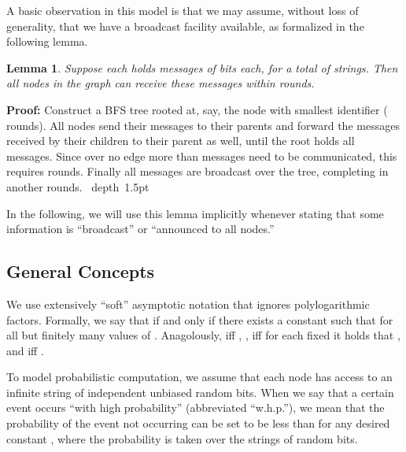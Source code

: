 \documentclass[letterpaper,11pt]{article}
\newtheorem{lemma}[theorem]{Lemma}
\newcommand{\blackslug}{\hbox{\hskip 1pt \vrule width 4pt height 8pt
depth 1.5pt \hskip 1pt}}
\newcommand{\QED}{\quad\blackslug\lower 8.5pt\null\par}
\newenvironment{proof}[1][Proof:]{\noindent \textbf{#1}\xspace}{\QED}
\begin{document}
A basic observation in this model is that we may assume, without loss
of generality, that we have a broadcast facility available, as
formalized in the following lemma.
\begin{lemma}
Suppose each  holds  messages of  bits
each, for a total of  strings. Then all nodes in the
graph can receive these  messages within  rounds.
\end{lemma}
\begin{proof}
Construct a BFS tree rooted at, say, the node  with smallest identifier
( rounds). All nodes send their messages to their parents and
forward the messages received by their children to their parent as well, until
the root holds all messages. Since over no edge more than  messages need to be
communicated, this requires  rounds. Finally all messages are
broadcast over the tree, completing in another  rounds.
\end{proof}
In the following, we will use this lemma implicitly whenever stating that some
information is ``broadcast'' or ``announced to all nodes.''

\subsection{General Concepts}
 We use  extensively ``soft'' asymptotic notation that ignores
 polylogarithmic factors. Formally, we say that  if and only if there exists a constant  such that
 for all but finitely many values of .
Anagolously,  iff , ,  iff for each fixed
 it holds that , and
 iff .

To model probabilistic computation, we assume that each node has
access to an infinite string of independent 
unbiased random bits.  When we say that a certain event occurs ``with high
probability'' (abbreviated ``w.h.p.''), we mean that the probability of the
event not occurring can be set to be less than  for any desired constant
, where the probability is taken over the strings of random bits.
\end{document}
